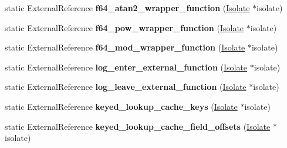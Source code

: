 \begin{DoxyCompactItemize}
\item 
static External\+Reference {\bfseries f64\+\_\+atan2\+\_\+wrapper\+\_\+function} (\hyperlink{classv8_1_1internal_1_1_isolate}{Isolate} $\ast$isolate)\hypertarget{classv8_1_1internal_1_1_b_a_s_e___e_m_b_e_d_d_e_d_ade20c4174da25ec2b97c7d99fe2db101}{}\label{classv8_1_1internal_1_1_b_a_s_e___e_m_b_e_d_d_e_d_ade20c4174da25ec2b97c7d99fe2db101}

\item 
static External\+Reference {\bfseries f64\+\_\+pow\+\_\+wrapper\+\_\+function} (\hyperlink{classv8_1_1internal_1_1_isolate}{Isolate} $\ast$isolate)\hypertarget{classv8_1_1internal_1_1_b_a_s_e___e_m_b_e_d_d_e_d_a9547ff33e8889b9f31d4e4ae7113dc36}{}\label{classv8_1_1internal_1_1_b_a_s_e___e_m_b_e_d_d_e_d_a9547ff33e8889b9f31d4e4ae7113dc36}

\item 
static External\+Reference {\bfseries f64\+\_\+mod\+\_\+wrapper\+\_\+function} (\hyperlink{classv8_1_1internal_1_1_isolate}{Isolate} $\ast$isolate)\hypertarget{classv8_1_1internal_1_1_b_a_s_e___e_m_b_e_d_d_e_d_a152a60672f08dc6d004578fa7a4c468b}{}\label{classv8_1_1internal_1_1_b_a_s_e___e_m_b_e_d_d_e_d_a152a60672f08dc6d004578fa7a4c468b}

\item 
static External\+Reference {\bfseries log\+\_\+enter\+\_\+external\+\_\+function} (\hyperlink{classv8_1_1internal_1_1_isolate}{Isolate} $\ast$isolate)\hypertarget{classv8_1_1internal_1_1_b_a_s_e___e_m_b_e_d_d_e_d_ae24403a110e5684122cd1320686fdf19}{}\label{classv8_1_1internal_1_1_b_a_s_e___e_m_b_e_d_d_e_d_ae24403a110e5684122cd1320686fdf19}

\item 
static External\+Reference {\bfseries log\+\_\+leave\+\_\+external\+\_\+function} (\hyperlink{classv8_1_1internal_1_1_isolate}{Isolate} $\ast$isolate)\hypertarget{classv8_1_1internal_1_1_b_a_s_e___e_m_b_e_d_d_e_d_adcc91a944b7fd1206a844bc1c53692b7}{}\label{classv8_1_1internal_1_1_b_a_s_e___e_m_b_e_d_d_e_d_adcc91a944b7fd1206a844bc1c53692b7}

\item 
static External\+Reference {\bfseries keyed\+\_\+lookup\+\_\+cache\+\_\+keys} (\hyperlink{classv8_1_1internal_1_1_isolate}{Isolate} $\ast$isolate)\hypertarget{classv8_1_1internal_1_1_b_a_s_e___e_m_b_e_d_d_e_d_a90d328d28f511c289b9b381d7b9ad568}{}\label{classv8_1_1internal_1_1_b_a_s_e___e_m_b_e_d_d_e_d_a90d328d28f511c289b9b381d7b9ad568}

\item 
static External\+Reference {\bfseries keyed\+\_\+lookup\+\_\+cache\+\_\+field\+\_\+offsets} (\hyperlink{classv8_1_1internal_1_1_isolate}{Isolate} $\ast$isolate)\hypertarget{classv8_1_1internal_1_1_b_a_s_e___e_m_b_e_d_d_e_d_a9e3090037f96fe7842a2866d06a30bc1}{}\label{classv8_1_1internal_1_1_b_a_s_e___e_m_b_e_d_d_e_d_a9e3090037f96fe7842a2866d06a30bc1}


\end{DoxyCompactItemize}
